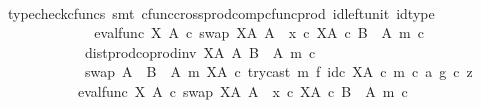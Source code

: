 \begin{isabellebody}
\ \ \ \ \ \ \ \ \ \ \ \ \isamarkupfalse%
\ {\isacharparenleft}{\kern0pt}typecheck{\isacharunderscore}{\kern0pt}cfuncs{\isacharcomma}{\kern0pt}\ smt\ cfunc{\isacharunderscore}{\kern0pt}cross{\isacharunderscore}{\kern0pt}prod{\isacharunderscore}{\kern0pt}comp{\isacharunderscore}{\kern0pt}cfunc{\isacharunderscore}{\kern0pt}prod\ id{\isacharunderscore}{\kern0pt}left{\isacharunderscore}{\kern0pt}unit{}\ id{\isacharunderscore}{\kern0pt}type{\isacharparenright}{\kern0pt}\isanewline
\ \ \ \ \ \ \ \ \ \ \isamarkupfalse%
\ \isamarkupfalse%
\ {\isachardoublequoteopen}{\isacharparenleft}{\kern0pt}eval{\isacharunderscore}{\kern0pt}func\ X\ A\ {\isasymcirc}\isactrlsub c\ swap\ {\isacharparenleft}{\kern0pt}X\isactrlbsup A\isactrlesup {\isacharparenright}{\kern0pt}\ A{\isacharparenright}{\kern0pt}\ {\isasymamalg}\ {\isacharparenleft}{\kern0pt}x\ {\isasymcirc}\isactrlsub c\ {\isasymbeta}\isactrlbsub X\isactrlbsup A\isactrlesup \ {\isasymtimes}\isactrlsub c\ {\isacharparenleft}{\kern0pt}B\ {\isasymsetminus}\ {\isacharparenleft}{\kern0pt}A{\isacharcomma}{\kern0pt}\ m{\isacharparenright}{\kern0pt}{\isacharparenright}{\kern0pt}\isactrlesub {\isacharparenright}{\kern0pt}\ {\isasymcirc}\isactrlsub c\isanewline
\ \ \ \ \ \ \ \ \ \ \ \ dist{\isacharunderscore}{\kern0pt}prod{\isacharunderscore}{\kern0pt}coprod{\isacharunderscore}{\kern0pt}inv\ {\isacharparenleft}{\kern0pt}X\isactrlbsup A\isactrlesup {\isacharparenright}{\kern0pt}\ A\ {\isacharparenleft}{\kern0pt}B\ {\isasymsetminus}\ {\isacharparenleft}{\kern0pt}A{\isacharcomma}{\kern0pt}\ m{\isacharparenright}{\kern0pt}{\isacharparenright}{\kern0pt}\ {\isasymcirc}\isactrlsub c\isanewline
\ \ \ \ \ \ \ \ \ \ \ \ swap\ {\isacharparenleft}{\kern0pt}A\ {\isasymCoprod}\ {\isacharparenleft}{\kern0pt}B\ {\isasymsetminus}\ {\isacharparenleft}{\kern0pt}A{\isacharcomma}{\kern0pt}\ m{\isacharparenright}{\kern0pt}{\isacharparenright}{\kern0pt}{\isacharparenright}{\kern0pt}\ {\isacharparenleft}{\kern0pt}X\isactrlbsup A\isactrlesup {\isacharparenright}{\kern0pt}\ {\isasymcirc}\isactrlsub c\ {\isacharparenleft}{\kern0pt}try{\isacharunderscore}{\kern0pt}cast\ m\ {\isasymtimes}\isactrlsub f\ id\isactrlsub c\ {\isacharparenleft}{\kern0pt}X\isactrlbsup A\isactrlesup {\isacharparenright}{\kern0pt}{\isacharparenright}{\kern0pt}\ {\isasymcirc}\isactrlsub c\ {\isasymlangle}m\ {\isasymcirc}\isactrlsub c\ a{\isacharcomma}{\kern0pt}\ g\ {\isasymcirc}\isactrlsub c\ z{\isasymrangle}\isanewline
\ \ \ \ \ \ \ \ \ \ {\isacharequal}{\kern0pt}\ {\isacharparenleft}{\kern0pt}eval{\isacharunderscore}{\kern0pt}func\ X\ A\ {\isasymcirc}\isactrlsub c\ swap\ {\isacharparenleft}{\kern0pt}X\isactrlbsup A\isactrlesup {\isacharparenright}{\kern0pt}\ A{\isacharparenright}{\kern0pt}\ {\isasymamalg}\ {\isacharparenleft}{\kern0pt}x\ {\isasymcirc}\isactrlsub c\ {\isasymbeta}\isactrlbsub X\isactrlbsup A\isactrlesup \ {\isasymtimes}\isactrlsub c\ {\isacharparenleft}{\kern0pt}B\ {\isasymsetminus}\ {\isacharparenleft}{\kern0pt}A{\isacharcomma}{\kern0pt}\ m{\isacharparenright}{\kern0pt}{\isacharparenright}{\kern0pt}\isactrlesub {\isacharparenright}{\kern0pt}\ {\isasymcirc}\isactrlsub c\isanewline

\end{isabellebody}

